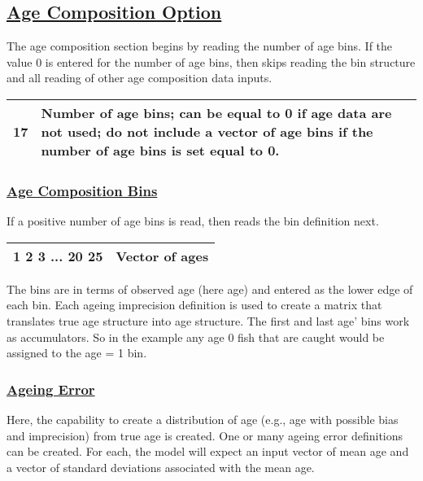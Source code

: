 \subsection[Age Composition Option]{\protect\hyperlink{AgeCompOption}{Age Composition Option}}
The age composition section begins by reading the number of age bins. If the value 0 is entered for the number of age bins, then skips reading the bin structure and all reading of other age composition data inputs.
\begin{center}
	\vspace*{-\baselineskip}
	\begin{tabular}{p{3cm} p{13cm}}
		\hline
		17 \Tstrut & Number of age bins; can be equal to 0 if age data are not used; do not include a vector of age bins if the number of age bins is set equal to 0. \Bstrut\\
		\hline
	\end{tabular}
	\leavevmode\tagmcend\tagstructend\par
\end{center}

\hypertarget{AgeCompBins}{}
\subsubsection[Age Composition Bins]{\protect\hyperlink{AgeCompBins}{Age Composition Bins}}
If a positive number of age bins is read, then reads the bin definition next.
\begin{center}
	\vspace*{-\baselineskip}
	\begin{tabular}{p{3cm} p{13cm}}
		\hline
		1 2 3 ... 20 25 & Vector of ages \Tstrut\Bstrut\\
		\hline		
	\end{tabular}
	\leavevmode\tagmcend\tagstructend\par
\end{center}
The bins are in terms of observed age (here age) and entered as the lower edge of each bin. Each ageing imprecision definition is used to create a matrix that translates true age structure into age structure. The first and last age' bins work as accumulators. So in the example any age 0 fish that are caught would be assigned to the age = 1 bin.

\hypertarget{AgeError}{}
\subsubsection[Ageing Error]{\protect\hyperlink{AgeError}{Ageing Error}}
Here, the capability to create a distribution of age (e.g., age with possible bias and imprecision) from true age is created. One or many ageing error definitions can be created. For each, the model will expect an input vector of mean age and a vector of standard deviations associated with the mean age. 

